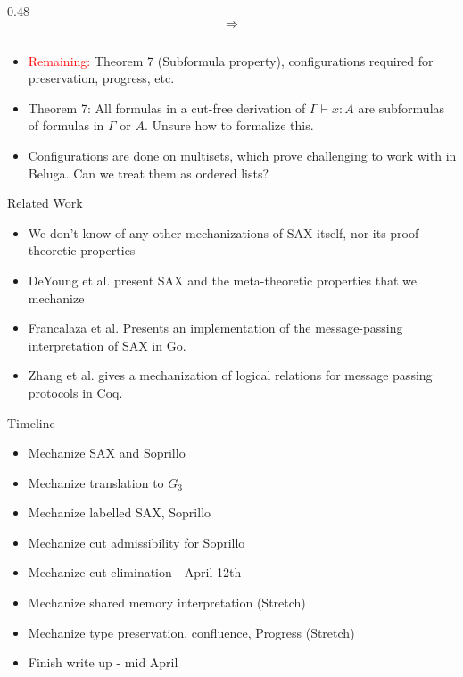 \documentclass[9ps]{beamer}
\begin{document}
\begin{frame}{}
\begin{columns}
\begin{column}{0.48\linewidth}
            $$\Longrightarrow$$
        \end{column}
    \end{columns}
\end{frame}


\begin{frame}{}
    \begin{itemize}
        \item \textcolor{red}{Remaining:} Theorem 7 (Subformula property), configurations required for preservation, progress, etc.
        \item Theorem 7: All formulas in a cut-free derivation of $\Gamma \vdash x : A$ are subformulas of formulas in $\Gamma$ or $A$. Unsure how to formalize this. 
        \item Configurations are done on multisets, which prove challenging to work with in Beluga. Can we treat them as ordered lists? 
    \end{itemize}
\end{frame}

\begin{frame} {Related Work}
    \begin{itemize}
        \item We don't know of any other mechanizations of SAX itself, nor its proof theoretic properties
        \item DeYoung et al. present SAX and the meta-theoretic properties that we mechanize
        \item Francalaza et al. Presents an implementation of the message-passing interpretation of SAX in Go. 
        \item Zhang et al. gives a mechanization of logical relations for message passing protocols in Coq.
    \end{itemize}

\end{frame}

\begin{frame}{Timeline}
  \begin{itemize}
    \item Mechanize SAX and Soprillo  \checkmark
    \item Mechanize translation to $G_3$  \checkmark
    \item Mechanize labelled SAX, Soprillo  \checkmark
    \item Mechanize cut admissibility for Soprillo  \checkmark
    \item Mechanize cut elimination - April 12th 
    \item Mechanize shared memory interpretation (Stretch)  
    \item Mechanize type preservation, confluence, Progress (Stretch)
    \item Finish write up - mid April
  \end{itemize} 
\end{frame}
\end{document}
